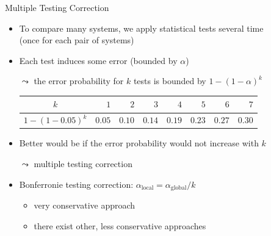 \begin{frame}[c]{Multiple Testing Correction}

\begin{itemize}
	\item To compare many systems, we apply statistical tests several time\\
	(once for each pair of systems)
	\item Each test induces some error (bounded by $\alpha$)
	\item[$\leadsto$] the error probability for $k$ tests is bounded by $1 - (1 - \alpha)^k$
	\begin{table}
		{\small
		\begin{tabular}{c|rrrrrrr}
			$k$ & $ 1$ & $ 2$ & $ 3$ & $ 4$ & $ 5$ & $ 6$ & $ 7$\\
			\hline
			$1-(1-0.05)^k$ & $0.05$ & $0.10$ & $0.14$ & $0.19$ & $0.23$ & $0.27$ & $0.30$
		\end{tabular}}
	\end{table}
	\pause
	\smallskip
	\item Better would be if the error probability would not increase with $k$
	\item[$\leadsto$] multiple testing correction
	\pause
	\smallskip
	\item Bonferronie testing correction: $\alpha_{\text{local}} = \alpha_{\text{global}} / k$
	\pause
	\begin{itemize}
		\item very conservative approach
		\item there exist other, less conservative approaches
	\end{itemize}
	
\end{itemize}

\end{frame}
